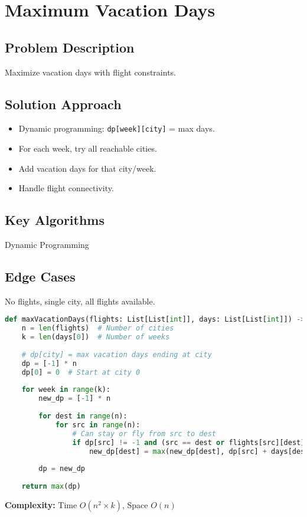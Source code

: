 \documentclass[10pt, a4paper]{article}
\begin{document}
\section{Maximum Vacation Days}
\subsection*{Problem Description}
Maximize vacation days with flight constraints.

\subsection*{Solution Approach}
\begin{itemize}
    \item Dynamic programming: \texttt{dp[week][city]} = max days.
    \item For each week, try all reachable cities.
    \item Add vacation days for that city/week.
    \item Handle flight connectivity.
\end{itemize}

\subsection*{Key Algorithms}
Dynamic Programming

\subsection*{Edge Cases}
No flights, single city, all flights available.

\begin{lstlisting}[language=Python]
def maxVacationDays(flights: List[List[int]], days: List[List[int]]) -> int:
    n = len(flights)  # Number of cities
    k = len(days[0])  # Number of weeks
    
    # dp[city] = max vacation days ending at city
    dp = [-1] * n
    dp[0] = 0  # Start at city 0
    
    for week in range(k):
        new_dp = [-1] * n
        
        for dest in range(n):
            for src in range(n):
                # Can stay or fly from src to dest
                if dp[src] != -1 and (src == dest or flights[src][dest]):
                    new_dp[dest] = max(new_dp[dest], dp[src] + days[dest][week])
        
        dp = new_dp
    
    return max(dp)
\end{lstlisting}
\textbf{Complexity:} Time $O(n^2 \times k)$, Space $O(n)$
\end{document}
